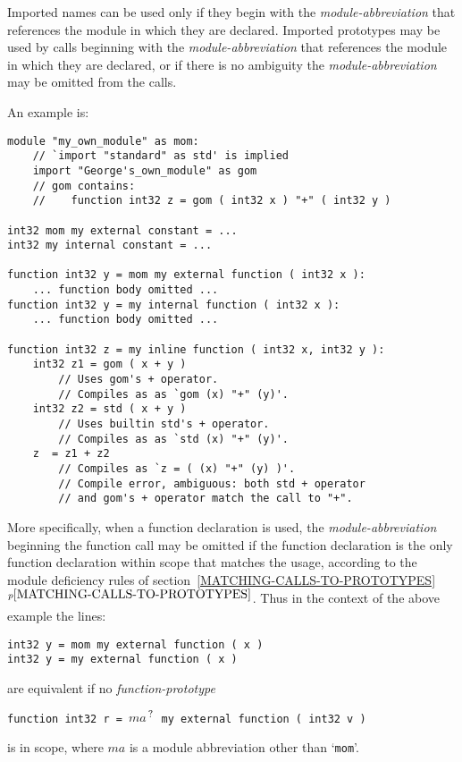 \documentclass[12pt]{article}
\newcommand{\itemref}[1]{\ref{#1}$^{p\pageref{#1}}$}
\newcommand{\QMARK}{{$^{\,\mbox{\footnotesize ?}}$}}
\newenvironment{indpar}[1][0.3in]%
	{\begin{list}{}%
		     {\setlength{\itemsep}{0in}%
		      \setlength{\topsep}{0in}%
		      \setlength{\parsep}{1ex}%
		      \setlength{\labelwidth}{#1}%
		      \setlength{\leftmargin}{#1}%
		      \addtolength{\leftmargin}{\labelsep}}%
	 \item}%
	{\end{list}}
\begin{document}
Imported names can be used only if they begin
with the {\em module-abbreviation} that references the module in which
they are declared.  Imported prototypes may be used by calls beginning with
the {\em module-abbreviation} that references the module in which
they are declared, or if there is no ambiguity the {\em module-abbreviation}
may be omitted from the calls.

An example is:
\begin{indpar}\begin{verbatim}
module "my_own_module" as mom:
    // `import "standard" as std' is implied
    import "George's_own_module" as gom
    // gom contains:
    //    function int32 z = gom ( int32 x ) "+" ( int32 y )

int32 mom my external constant = ...
int32 my internal constant = ...

function int32 y = mom my external function ( int32 x ):
    ... function body omitted ...
function int32 y = my internal function ( int32 x ):
    ... function body omitted ...

function int32 z = my inline function ( int32 x, int32 y ):
    int32 z1 = gom ( x + y )
        // Uses gom's + operator.
        // Compiles as as `gom (x) "+" (y)'.
    int32 z2 = std ( x + y )
        // Uses builtin std's + operator.
        // Compiles as as `std (x) "+" (y)'.
    z  = z1 + z2 
        // Compiles as `z = ( (x) "+" (y) )'.
        // Compile error, ambiguous: both std + operator
        // and gom's + operator match the call to "+".
\end{verbatim}\end{indpar}\label{EXTERNAL-INTERNAL-EXAMPLE}

More specifically,
when a function declaration is used, the {\em module-abbreviation}
beginning the function call may be omitted if the function declaration is
the only function declaration within scope that matches the usage,
according to the module deficiency rules of
section~\itemref{MATCHING-CALLS-TO-PROTOTYPES}.
Thus in the context of the above example the lines:
\begin{indpar}\begin{verbatim}
int32 y = mom my external function ( x )
int32 y = my external function ( x )
\end{verbatim}\end{indpar}
are equivalent if no {\em function-prototype}
\begin{center}
\tt function int32 r = $ma$\QMARK{} my external function ( int32 v )
\end{center}
is in scope, where $ma$ is a module abbreviation other than `{\tt mom}'.
\end{document}
